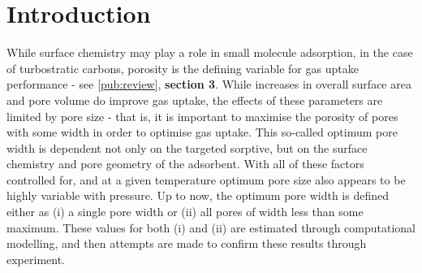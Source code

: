 \newpage
\section{Introduction}
While surface chemistry may play a role in small molecule \gls{adsorption},\citep{Lueking2004, Li2011a, Li2020Sustainable, wang2012significantly, Botome2017Preparation, liang2013, Kayal2018Activated} in the case of \glspl{turbostratic carbon}, porosity is the defining variable for gas uptake performance\citep{Sevilla2014Energy, Adeniran2016Is, Sevilla2013Assessment, Choi2019Unique, Lee2013Determination, Presser2011Effect, Wickramaratne2013Importance} - see \ref{pub:review}, \textbf{section 3}. While increases in overall surface area and pore volume do improve gas uptake,\citep{Cox2017Ultra, Blankenship2017Cigarette} the effects of these parameters are limited by pore size\citep{Sevilla2014Energy, Sevilla2013Assessment} \citep{Choi2019Unique, Li2019Selective, Cabria2007optimum, Gogotsi2009, Masika2012} - that is, it is important to maximise the porosity of pores with some width in order to optimise gas uptake. This so-called optimum pore width is dependent not only on the targeted sorptive,\citep{Presser2011Effect, Biloe2002Optimal, Cabria2007optimum} but on the surface chemistry\citep{wang2012significantly, Kayal2018Activated, Lueking2004} and pore geometry\citep{Rzepka1998Physisorption, Zhou2004comparative, Hlushak2018Heat} of the \gls{adsorbent}. With all of these factors controlled for, and at a given temperature optimum pore size also appears to be highly variable with pressure.\citep{Presser2011Effect, DelaCasaLillo2002Hydrogen} Up to now, the optimum pore width is defined either as (i) a single pore width\citep{Sevilla2014Energy, Choi2019Unique, Li2019Selective} or (ii) all pores of width less than some maximum.\citep{Biloe2002Optimal, Cabria2007optimum, Presser2011Effect} These values for both (i) and (ii) are estimated through computational modelling,\citep{Biloe2002Optimal, Cabria2007optimum, Hlushak2018Heat} and then attempts are made to confirm these results through experiment.\citep{Choi2019Unique, Presser2011Effect}

